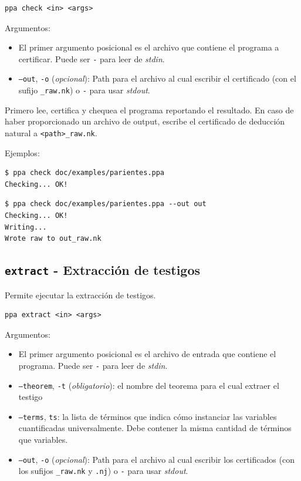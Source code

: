 \begin{verbatim}
ppa check <in> <args>
\end{verbatim}

Argumentos:

\begin{itemize}
    \item El primer argumento posicional es el archivo que contiene el programa
    a certificar. Puede ser \texttt{-} para leer de \textit{stdin}.
    \item \texttt{--out}, \texttt{-o} (\textit{opcional}): Path para el archivo
    al cual escribir el certificado (con el sufijo \texttt{\_raw.nk}) o
    \texttt{-} para usar \textit{stdout}.
\end{itemize}


Primero lee, certifica y chequea el programa reportando el resultado. En caso de
haber proporcionado un archivo de output, escribe el certificado de deducción
natural a \texttt{<path>\_raw.nk}.

Ejemplos:

\begin{verbatim}
$ ppa check doc/examples/parientes.ppa
Checking... OK!
\end{verbatim}

\begin{verbatim}
$ ppa check doc/examples/parientes.ppa --out out   
Checking... OK!
Writing...
Wrote raw to out_raw.nk
\end{verbatim}

\subsection{\texttt{extract} - Extracción de testigos}

Permite ejecutar la extracción de testigos.

\begin{verbatim}
ppa extract <in> <args>
\end{verbatim}

Argumentos:

\begin{itemize}
    \item El primer argumento posicional es el archivo de entrada que contiene
    el programa. Puede ser \texttt{-} para leer de \textit{stdin}.
    \item \texttt{--theorem}, \texttt{-t} (\textit{obligatorio}): el nombre del
    teorema para el cual extraer el testigo
    \item \texttt{--terms}, \texttt{ts}: la lista de términos que indica cómo
    instanciar las variables cuantificadas universalmente. Debe contener la
    misma cantidad de términos que variables.
    \item \texttt{--out}, \texttt{-o} (\textit{opcional}): Path para el archivo
    al cual escribir los certificados (con los sufijos \texttt{\_raw.nk} y
    \texttt{.nj}) o \texttt{-} para usar \textit{stdout}.
\end{itemize}

